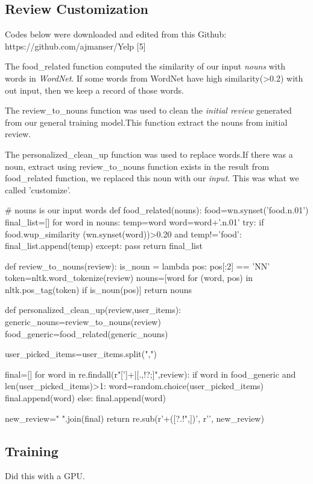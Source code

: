 \documentclass[conference]{IEEEtran}
\begin{document}
\subsection{Review Customization}
\par Codes below were downloaded and edited from this Github: https://github.com/ajmanser/Yelp [5]
\par The food\_related function computed the similarity of our input \emph{nouns} with words in \emph{WordNet}. If some words from WordNet have high similarity(>0.2) with out input, then we keep a record of those words.
\par The review\_to\_nouns function was used to clean the \emph{initial review} generated from our general training model.This function extract the nouns from initial review.
\par 	The personalized\_clean\_up function was used to replace words.If there was a noun, extract using review\_to\_nouns function exists in the result from  food\_related function, we replaced this noun with our \emph{input}. This was what we called 'customize'.
\begin{python}
# nouns is our input words
def food_related(nouns):
    food=wn.synset('food.n.01')
    final_list=[]
    for word in nouns:
        temp=word
        word=word+'.n.01'
        try:
            if food.wup_similarity
               (wn.synset(word))>0.20 
                and temp!='food':
                final_list.append(temp)
        except:
            pass
    return final_list

def review_to_nouns(review):
    is_noun = lambda pos: pos[:2] == 'NN'
    token=nltk.word_tokenize(review)
    nouns=[word for (word, pos) 
           in nltk.pos_tag(token) if is_noun(pos)]
    return nouns

def personalized_clean_up(review,user_items):
   generic_nouns=review_to_nouns(review)
   food_generic=food_related(generic_nouns)

   user_picked_items=user_items.split(",")

   final=[]
   for word in re.findall(r"[\w']+|[.,!?;]",review):
        if word in food_generic and 
        len(user_picked_items)>1:
            word=random.choice(user_picked_items)
            final.append(word)
        else:
            final.append(word)

    new_review=" ".join(final)
    return re.sub(r'\s+([?.!",])', r'\1',
                  new_review)

\end{python}
\subsection{Training}
\par Did this with a GPU.
\end{document}
